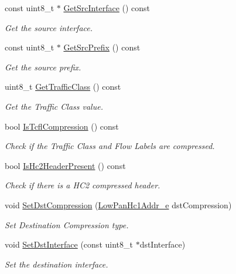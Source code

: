 \begin{DoxyCompactItemize}
const uint8\+\_\+t $\ast$ \hyperlink{classns3_1_1SixLowPanHc1_a9e38ac956554add7175ffd4e3df523d3}{Get\+Src\+Interface} () const 
\begin{DoxyCompactList}\small\item\em Get the source interface. \end{DoxyCompactList}\item 
const uint8\+\_\+t $\ast$ \hyperlink{classns3_1_1SixLowPanHc1_a68ec07ddb32db26ea20acad704ecffd2}{Get\+Src\+Prefix} () const 
\begin{DoxyCompactList}\small\item\em Get the source prefix. \end{DoxyCompactList}\item 
uint8\+\_\+t \hyperlink{classns3_1_1SixLowPanHc1_a4a4b03b310d23103c676efe8f70bfdc4}{Get\+Traffic\+Class} () const 
\begin{DoxyCompactList}\small\item\em Get the Traffic Class value. \end{DoxyCompactList}\item 
bool \hyperlink{classns3_1_1SixLowPanHc1_aebeace2d975617b68e8885b17b94d75c}{Is\+Tcfl\+Compression} () const 
\begin{DoxyCompactList}\small\item\em Check if the Traffic Class and Flow Labels are compressed. \end{DoxyCompactList}\item 
bool \hyperlink{classns3_1_1SixLowPanHc1_a42e021c8d3e987ea22a4ba8f19d4513c}{Is\+Hc2\+Header\+Present} () const 
\begin{DoxyCompactList}\small\item\em Check if there is a H\+C2 compressed header. \end{DoxyCompactList}\item 
void \hyperlink{classns3_1_1SixLowPanHc1_a17c19e74c7154be39972d49a6c9c5969}{Set\+Dst\+Compression} (\hyperlink{classns3_1_1SixLowPanHc1_a29c864d9bf6bc466ee2214a95a83dcad}{Low\+Pan\+Hc1\+Addr\+\_\+e} dst\+Compression)
\begin{DoxyCompactList}\small\item\em Set Destination Compression type. \end{DoxyCompactList}\item 
void \hyperlink{classns3_1_1SixLowPanHc1_a82d85e05c00aeec9f53fb6e8e05eadd9}{Set\+Dst\+Interface} (const uint8\+\_\+t $\ast$dst\+Interface)
\begin{DoxyCompactList}\small\item\em Set the destination interface. \end{DoxyCompactList}\item 

\end{DoxyCompactItemize}
